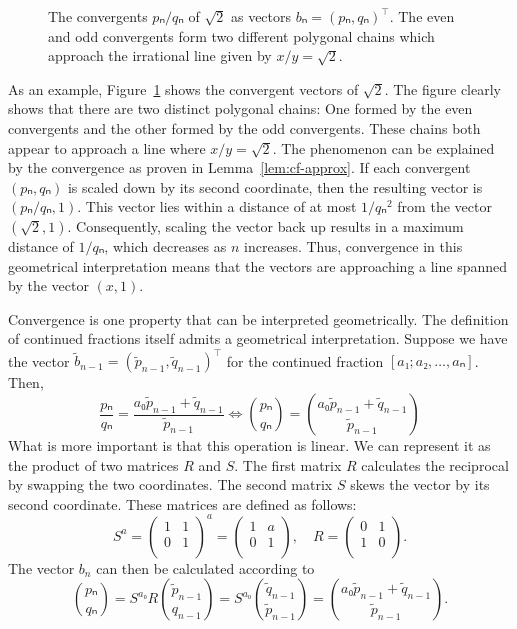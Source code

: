 \begin{figure}[tb]
  \centering
  
  \caption{
    The convergents $pₙ/qₙ$ of $\sqrt{2}$ as vectors $bₙ = (pₙ, qₙ)^⊤$.
    The even and odd convergents form two different polygonal chains which
    approach the irrational line given by $x/y = \sqrt{2}$.
  }
  \label{fig:klein-polygon}
\end{figure}

As an example, Figure~\ref{fig:klein-polygon} shows the convergent vectors of $\sqrt{2}$.
The figure clearly shows that there are two distinct polygonal chains:
One formed by the even convergents and the other formed by the odd convergents.
These chains both appear to approach a line where $x/y = \sqrt{2}$.
The phenomenon can be explained by the convergence as proven in Lemma~\ref{lem:cf-approx}.
If each convergent $(pₙ, qₙ)$ is scaled down by its second coordinate,
then the resulting vector is $(pₙ/qₙ, 1)$.
This vector lies within a distance of at most $1/qₙ^2$ from the vector $(\sqrt{2}, 1)$.
Consequently, scaling the vector back up results in a maximum distance of $1/qₙ$,
which decreases as $n$ increases.
Thus, convergence in this geometrical interpretation means that the vectors are
approaching a line spanned by the vector $(x, 1)$.

Convergence is one property that can be interpreted geometrically.
The definition of continued fractions itself admits a geometrical interpretation.
Suppose we have the vector $\tilde b_{n-1} = (\tilde p_{n-1}, \tilde q_{n-1})^⊤$
for the continued fraction $[a₁; a₂, …, aₙ]$.
Then,
\[
  \frac{pₙ}{qₙ}
  = \frac{a₀ \tilde p_{n-1} + \tilde q_{n-1}}{\tilde p_{n-1}}
  \iff
  \binom{pₙ}{qₙ}
  = \binom{a₀ \tilde p_{n-1} + \tilde q_{n-1}}{\tilde p_{n-1}}
\]
What is more important is that this operation is linear.
We can represent it as the product of two matrices $R$ and $S$.
The first matrix $R$ calculates the reciprocal by swapping the two coordinates.
The second matrix $S$ skews the vector by its second coordinate.
These matrices are defined as follows:
\[
  S^a =
  \begin{pmatrix}
    1 & 1 \\
    0 & 1 \\
  \end{pmatrix}^a
  =
  \begin{pmatrix}
    1 & a \\
    0 & 1 \\
  \end{pmatrix},
  \quad
  R =
  \begin{pmatrix}
    0 & 1 \\
    1 & 0 \\
  \end{pmatrix}.
\]
The vector $b_n$ can then be calculated according to
\[
  \binom{pₙ}{qₙ}
  = S^{a₀} R \binom{\tilde p_{n-1}}{q_{n-1}}
  = S^{a₀} \binom{\tilde q_{n-1}}{\tilde p_{n-1}}
  = \binom{a₀ \tilde p_{n-1} + \tilde q_{n-1}}{\tilde p_{n-1}}.
\]

